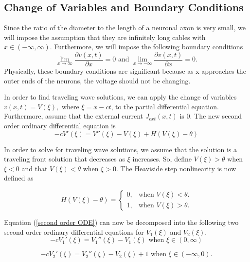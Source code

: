 \documentclass[12pt]{article}
\begin{document}
\subsection{Change of Variables and Boundary Conditions}
Since the ratio of the diameter to the length of a neuronal axon is very small, we will impose the assumption that they are infinitely long cables with $x\in (-\infty,\infty)$. Furthermore, we will impose the following boundary conditions
$$\lim_{x\to\infty} \frac{\partial v(x,t)}{\partial x}=0 \text{ and } \lim_{x\to-\infty} \frac{\partial v(x,t)}{\partial x}=0.$$
Physically, these boundary conditions are significant because as x approaches the outer ends of the neurons, the voltage should not be changing. \par
In order to find traveling wave solutions, we can apply the change of variables $v(x,t)=V(\xi),$ where $\xi=x-ct$, to the partial differential equation. Furthermore, assume that the external current $J_{ext}(x,t)$ is $0$. The new second order ordinary differential equation is 
\begin{equation}
\label{second order ODE}
-cV'(\xi)=V''(\xi)-V(\xi)+H(V(\xi)-\theta)
\end{equation}

In order to solve for traveling wave solutions, we assume that the solution is a traveling front solution that decreases as $\xi$ increases. So, define $V(\xi)>\theta$ when $\xi<0$ and that $V(\xi)<\theta$ when $\xi>0$. The Heaviside step nonlinearity is now defined as 

\begin{equation}
  H(V(\xi)-\theta)=\begin{cases}
    0, & \text{when $V(\xi)<\theta$}.\\
    1, & \text{when $V(\xi)>\theta$}.
  \end{cases}
\end{equation}

Equation (\ref{second order ODE}) can now be decomposed into the following two second order ordinary differential equations for $V_1(\xi)$ and $V_2(\xi)$.
\begin{equation}
\label{ODE1}
-cV_1'(\xi)=V_1''(\xi)-V_1(\xi) \text{ when  $\xi \in (0,\infty)$}
\end{equation}

\begin{equation}
\label{ODE2} 
-cV_2'(\xi)=V_2''(\xi)-V_2(\xi)+1 \text{ when $\xi \in (-\infty,0)$.}
\end{equation}
\end{document}
